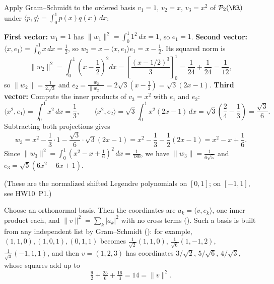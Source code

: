 \documentclass[10pt]{scrartcl}
\newcommand{\ip}[2]{\langle #1,#2\rangle}
\begin{document}
\begin{example*}[Ex.~70 / LADR 6.33: Gram--Schmidt on $\PP_2(\RR)$ with $\ip pq=\int_0^1 p(x)q(x)\,dx$]
  Apply Gram--Schmidt to the ordered basis $v_1=1$, $v_2=x$, $v_3=x^2$ of $\PP_2(\RR)$ under $\ip pq=\int_0^1 p(x)q(x)\,dx$:
  \begin{steps}
    \ii \textbf{First vector:} $w_1=1$ has $\|w_1\|^2=\int_0^1 1^2\,dx=1$, so $e_1=1$.
    \ii \textbf{Second vector:} $\ip x{e_1}=\int_0^1 x\,dx=\frac{1}{2}$, so $w_2 = x - \ip x{e_1}e_1 = x - \frac{1}{2}$. Its squared norm is
    \[
      \|w_2\|^2 = \int_0^1 \left(x-\frac{1}{2}\right)^2 dx = \left[\frac{(x-1/2)^3}{3}\right]_0^1 = \frac{1}{24} + \frac{1}{24} = \frac{1}{12},
    \]
    so $\|w_2\|=\frac{1}{2\sqrt 3}$ and $e_2 = \frac{w_2}{\|w_2\|} = 2\sqrt{3}\left(x-\frac{1}{2}\right) = \sqrt{3}(2x-1)$.
    \ii \textbf{Third vector:} Compute the inner products of $v_3=x^2$ with $e_1$ and $e_2$:
    \[
      \ip{x^2}{e_1} = \int_0^1 x^2\,dx = \frac{1}{3}, \qquad \ip{x^2}{e_2} = \sqrt{3}\int_0^1 x^2(2x-1)\,dx = \sqrt{3}\left(\frac{2}{4}-\frac{1}{3}\right) = \frac{\sqrt 3}{6}.
    \]
    Subtracting both projections gives
    \[
      w_3 = x^2 - \frac{1}{3}\cdot 1 - \frac{\sqrt 3}{6}\cdot\sqrt{3}(2x-1) = x^2 - \frac{1}{3} - \frac{1}{2}(2x-1) = x^2 - x + \frac{1}{6}.
    \]
    Since $\|w_3\|^2=\int_0^1(x^2-x+\frac{1}{6})^2\,dx=\frac{1}{180}$, we have $\|w_3\|=\frac{1}{6\sqrt 5}$ and $e_3=\sqrt{5}(6x^2-6x+1)$.
  \end{steps}
  (These are the normalized shifted Legendre polynomials on $[0,1]$; on $[-1,1]$, see HW10~P1.)
\end{example*}

\revisit Choose an orthonormal basis. Then the coordinates are $a_k=\ip v{e_k}$, one inner product each, and $\|v\|^2=\sum_k|a_k|^2$ with no cross terms (). Such a basis is built from any independent list by Gram--Schmidt (): for example, $(1,1,0),(1,0,1),(0,1,1)$ becomes $\frac1{\sqrt2}(1,1,0)$, $\frac1{\sqrt6}(1,-1,2)$, $\frac1{\sqrt3}(-1,1,1)$, and then $v=(1,2,3)$ has coordinates $3/\sqrt2$, $5/\sqrt6$, $4/\sqrt3$, whose squares add up to
\[ \tfrac92+\tfrac{25}6+\tfrac{16}3=14=\|v\|^2. \]
\end{document}
